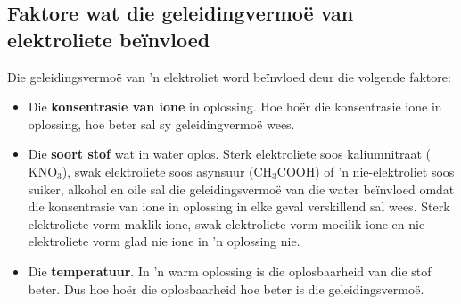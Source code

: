             \subsection*{Faktore wat die geleidingvermoë van elektroliete be\"invloed}
            \nopagebreak
Die geleidingsvermoë van 'n elektroliet word be\"invloed deur die volgende faktore:
        \label{m38720*id339291}\begin{itemize}[noitemsep]
\label{m38720*uid58}\item Die \textbf{konsentrasie van ione} in oplossing. Hoe ho\"{e}r die konsentrasie ione in oplossing, hoe beter sal sy geleidingvermo\"{e} wees.
\label{m38720*uid57}\item Die \textbf{soort stof} wat in water oplos. Sterk elektroliete soos kaliumnitraat (${\text{KNO}}_{3}$), swak elektroliete soos asynsuur (${\text{CH}}_{3}\text{COOH}$) of 'n nie-elektroliet soos suiker, alkohol en oile sal die geleidingsvermoë van die water beïnvloed omdat die konsentrasie van ione in oplossing in elke geval verskillend sal wees. Sterk elektroliete vorm maklik ione, swak elektroliete vorm moeilik ione en nie-elektroliete vorm glad nie ione in 'n oplossing nie.


\label{m38720*uid59}\item Die \textbf{temperatuur}. In 'n warm oplossing is die oplosbaarheid van die stof beter.  Dus hoe ho\"{e}r die oplosbaarheid hoe beter is die geleidingsvermo\"{e}.
\end{itemize} \nopagebreak
\label{m38720*secfhsst!!!underscore!!!id739}
